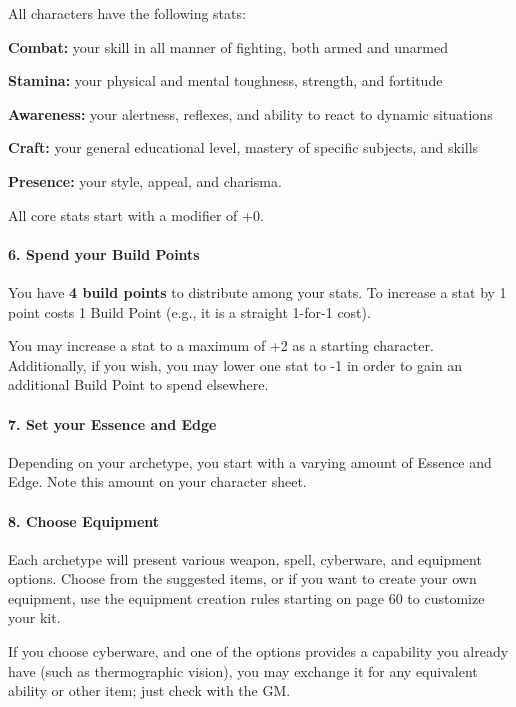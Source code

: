 \documentclass[oneside,10pt]{article}
\begin{document}
\begin{multicols}{2}
All characters have the following stats:
\begin{adjustwidth*}{.5cm}{.5cm}

\textbf{Combat:} your skill in all manner of fighting, both armed
and unarmed

\textbf{Stamina:} your physical and mental toughness, strength,
and fortitude

\textbf{Awareness:} your alertness, reflexes, and ability to react to
dynamic situations

\textbf{Craft:} your general educational level, mastery of specific
subjects, and skills

\textbf{Presence:} your style, appeal, and charisma.
\end{adjustwidth*}

All core stats start with a modifier of +0.

\paragraph{6.  Spend your Build Points}

You have \textbf{4 build points} to distribute among your stats. To
increase a stat by 1 point costs 1 Build Point (e.g., it is a
straight 1-for-1 cost).

You may increase a stat to a maximum of +2 as a starting
character. Additionally, if you wish, you may lower one stat
to -1 in order to gain an additional Build Point to spend elsewhere.

\paragraph{7.  Set your Essence and Edge}

Depending on your archetype, you start with a varying
amount of Essence and Edge. Note this amount on your character sheet.

\paragraph{8.  Choose Equipment}

Each archetype will present various weapon, spell, cyberware, and equipment options. Choose from the suggested
items, or if you want to create your own equipment, use the
equipment creation rules starting on page 60 to customize
your kit.

If you choose cyberware, and one of the options provides a
capability you already have (such as thermographic vision),
you may exchange it for any equivalent ability or other item;
just check with the GM.


\end{multicols}
\end{document}
